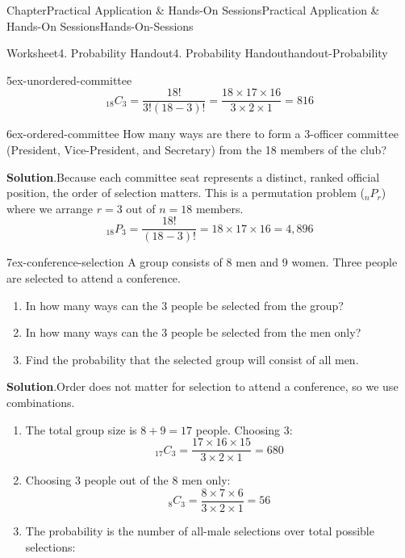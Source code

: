 \documentclass[oneside,10pt,]{book}
\newcommand{\blocktitlefont}{\relax}
\begin{document}
\begin{chapterptx}{Chapter}{Practical Application \& Hands-On Sessions}{}{Practical Application \& Hands-On Sessions}{}{}{Hands-On-Sessions}
\begin{worksheet-section}{Worksheet}{4. Probability Handout}{}{4. Probability Handout}{}{}{handout-Probability}
\begin{divisionexercise}{5}{}{}{ex-unordered-committee}
\begin{equation*}
_{18}C_{3} = \frac{18!}{3!(18-3)!} = \frac{18 \times 17 \times 16}{3 \times 2 \times 1} = 816
\end{equation*}
%
\end{divisionexercise}%
\begin{divisionexercise}{6}{}{}{ex-ordered-committee}%
How many ways are there to form a 3-officer committee (President, Vice-President, and Secretary) from the 18 members of the club?%
\par\smallskip%
\noindent\textbf{\blocktitlefont Solution}.\hypertarget{ex-ordered-committee-2}{}\quad{}Because each committee seat represents a distinct, ranked official position, the order of selection matters. This is a permutation problem (\(_nP_r\)) where we arrange \(r = 3\) out of \(n = 18\) members.%
\begin{equation*}
_{18}P_{3} = \frac{18!}{(18-3)!} = 18 \times 17 \times 16 = 4,896
\end{equation*}
%
\end{divisionexercise}%
\clearpage
\begin{divisionexercise}{7}{}{}{ex-conference-selection}%
A group consists of 8 men and 9 women. Three people are selected to attend a conference.%
\begin{enumerate}[label={\alph*}]
\item{}In how many ways can the 3 people be selected from the group?%
\item{}In how many ways can the 3 people be selected from the men only?%
\item{}Find the probability that the selected group will consist of all men.%
\end{enumerate}
%
\par\smallskip%
\noindent\textbf{\blocktitlefont Solution}.\hypertarget{ex-conference-selection-2}{}\quad{}Order does not matter for selection to attend a conference, so we use combinations.%
\begin{enumerate}[label={\alph*}]
\item{}The total group size is \(8 + 9 = 17\) people. Choosing 3:%
\begin{equation*}
_{17}C_{3} = \frac{17 \times 16 \times 15}{3 \times 2 \times 1} = 680
\end{equation*}
%
\item{}Choosing 3 people out of the 8 men only:%
\begin{equation*}
_8C_3 = \frac{8 \times 7 \times 6}{3 \times 2 \times 1} = 56
\end{equation*}
%
\item{}The probability is the number of all-male selections over total possible selections:%

\end{enumerate}
\end{divisionexercise}
\end{worksheet-section}
\end{chapterptx}
\end{document}
